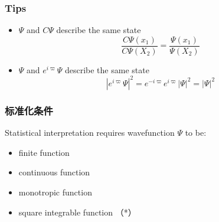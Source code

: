 \begin{frame}
    \frametitle{Tips}
    \begin{itemize}
        \item $\Psi$ and $C\Psi$ describe the same state 
        \[ \frac{C\Psi(x_1)}{C\Psi(X_2)} = \frac{\Psi(x_1)}{\Psi(X_2)}\]
        \item $\Psi$ and $e^{i\varpi}\Psi$ describe the same state 
         \[ |e^{i\varpi}\Psi|^2 = e^{-i\varpi} e^{i\varpi} |\Psi|^2 = |\Psi|^2 \] 
    \end{itemize}  
\end{frame}

\begin{frame}
    \frametitle{标准化条件}
    Statistical interpretation requires wavefunction $\Psi$ to be:
    \begin{itemize}
        \item finite  function
        \item continuous function 
        \item monotropic function
        \item square integrable function （*）
    \end{itemize}
\end{frame}


